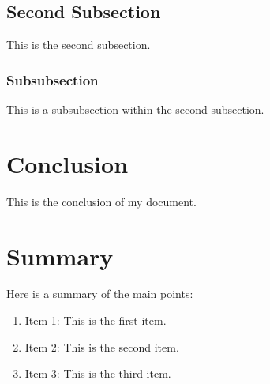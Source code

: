 \documentclass{article}
\begin{document}
\subsection{Second Subsection}

This is the second subsection.

\subsubsection{Subsubsection}

This is a subsubsection within the second subsection.

\section{Conclusion}

This is the conclusion of my document.

\section{Summary}

Here is a summary of the main points:

\begin{enumerate}
  \item Item 1: This is the first item.
  \item Item 2: This is the second item.
  \item Item 3: This is the third item.
\end{enumerate}
\end{document}
